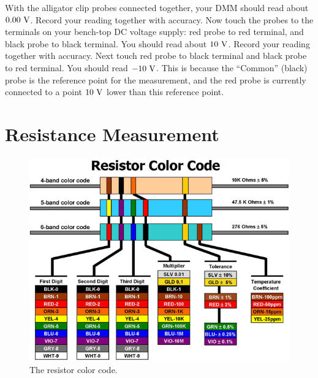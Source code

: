 \begin{measurement} With the alligator clip probes connected together, your DMM should
read about $0.00~\rm V$.  Record your reading together with accuracy.  Now touch the probes to the terminals on your
bench-top DC voltage supply: red probe to red terminal, and black
probe to black terminal.  You should read about $10~\rm V$. Record your reading together with accuracy.  Next touch red
probe to black terminal and black probe to red terminal.  You should
read $-10~\rm V$.  This is because the ``Common'' (black) probe is the
reference point for the measurement, and the red probe is currently
connected to a point $10~\rm V$ lower than this reference point. \end{measurement} 

\section{Resistance Measurement}

\begin{figure}[htbp]
\begin{center}
\includegraphics[height=0.45\textheight]{figs/labs/dc_circuits/rcolor.jpg}
\caption{The resistor color code.}
\label{fig:rcolor}
\end{center}
\end{figure}

